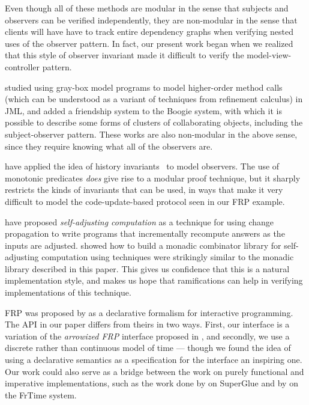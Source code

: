 \documentclass[preprint,natbib]{sigplanconf}
\begin{document}
Even though all of these methods are modular in the sense that
subjects and observers can be verified independently, they are
non-modular in the sense that clients will have have to track entire
dependency graphs when verifying nested uses of the observer
pattern. In fact, our present work began when we realized that this
style of observer invariant made it difficult to verify the
model-view-controller pattern.

\citet{shaner-leavens-naumann} studied using gray-box model programs
to model higher-order method calls (which can be understood as a
variant of techniques from refinement calculus) in JML, and
\citet{barnett-naumann} added a friendship system to the Boogie
system, with which it is possible to describe some forms of clusters of
collaborating objects, including the subject-observer pattern. 
These works are also
non-modular in the above sense, since they require 
knowing what all of the observers are.


\citet{history-invariants} have applied the idea of
history invariants~\cite{liskov-wing} to model observers. The use of
monotonic predicates \emph{does} give rise to a modular
proof technique, but it sharply restricts the kinds of invariants that
can be used, in ways that make it very difficult to model the
code-update-based protocol seen in our FRP example. 

\citet{self-adjusting} have proposed \emph{self-adjusting computation}
as a technique for using change propagation to write programs that
incrementally recompute answers as the inputs are
adjusted. \citet{carlsson} showed how to build a monadic combinator library for
self-adjusting computation using techniques were strikingly similar
to the monadic library described in this paper. This gives us 
confidence that this is a natural implementation style, and makes us 
hope that ramifications can help in verifying implementations of this
technique.

FRP was proposed by \citet{frp} as a declarative formalism for
interactive programming. The API in our paper differs from theirs in
two ways. First, our interface is a variation of the \emph{arrowized
  FRP} interface proposed in \citet{afrp}, and secondly, we use a
discrete rather than continuous model of time --- though we found the
idea of using a declarative semantics as a specification for the
interface an inspiring one.  Our work could also serve as a bridge
between the work on purely functional and imperative implementations,
such as the work done by \citet{superglue} on SuperGlue and by
\citet{frtime} on the FrTime system.
\end{document}
